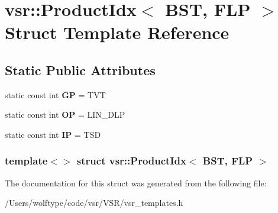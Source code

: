\hypertarget{structvsr_1_1_product_idx_3_01_b_s_t_00_01_f_l_p_01_4}{\section{vsr\-:\-:Product\-Idx$<$ B\-S\-T, F\-L\-P $>$ Struct Template Reference}
\label{structvsr_1_1_product_idx_3_01_b_s_t_00_01_f_l_p_01_4}
}
\subsection*{Static Public Attributes}
\begin{DoxyCompactItemize}
\item 
\hypertarget{structvsr_1_1_product_idx_3_01_b_s_t_00_01_f_l_p_01_4_ab0ef9740b0d35da861ea04043e697460}{static const int {\bfseries G\-P} = T\-V\-T}\label{structvsr_1_1_product_idx_3_01_b_s_t_00_01_f_l_p_01_4_ab0ef9740b0d35da861ea04043e697460}

\item 
\hypertarget{structvsr_1_1_product_idx_3_01_b_s_t_00_01_f_l_p_01_4_a33e6edcace26e49f41828384dabb0bc7}{static const int {\bfseries O\-P} = L\-I\-N\-\_\-\-D\-L\-P}\label{structvsr_1_1_product_idx_3_01_b_s_t_00_01_f_l_p_01_4_a33e6edcace26e49f41828384dabb0bc7}

\item 
\hypertarget{structvsr_1_1_product_idx_3_01_b_s_t_00_01_f_l_p_01_4_a8097ba1c4034f3e82fa3e4adf15b8f48}{static const int {\bfseries I\-P} = T\-S\-D}\label{structvsr_1_1_product_idx_3_01_b_s_t_00_01_f_l_p_01_4_a8097ba1c4034f3e82fa3e4adf15b8f48}

\end{DoxyCompactItemize}
\subsubsection*{template$<$$>$ struct vsr\-::\-Product\-Idx$<$ B\-S\-T, F\-L\-P $>$}



The documentation for this struct was generated from the following file\-:\begin{DoxyCompactItemize}
\item 
/\-Users/wolftype/code/vsr/\-V\-S\-R/vsr\-\_\-templates.\-h\end{DoxyCompactItemize}
